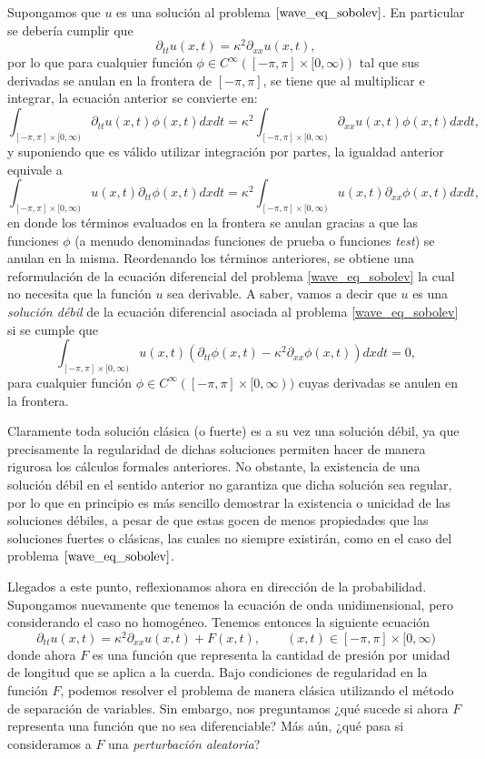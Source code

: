 \documentclass[letterpaper,twoside,12pt]{book}
\newcommand{\1}{\mathds{1}}
\theoremstyle{definition}
\theoremstyle{definition}
\theoremstyle{remark}
\theoremstyle{definition}
\theoremstyle{definition}
\theoremstyle{definition}
\theoremstyle{definition}
\theoremstyle{definition}
\begin{document}
Supongamos que $u$ es una solución al problema $\eqref{wave_eq_sobolev}$. En particular se debería cumplir que 
\[
\partial_{tt}u(x,t)=\kappa^2\partial_{xx}u(x,t),
\]
por lo que para cualquier función $\phi\in C^{\infty}\left([-\pi,\pi]\times [0,\infty)\right)$ tal que sus derivadas se anulan en la frontera de $[-\pi, \pi]$, se tiene que al multiplicar e integrar, la ecuación anterior se convierte en:
\[
    \int_{[-\pi,\pi]\times [0,\infty)}\partial_{tt}u(x,t)\phi(x,t)dx dt=\kappa^2\int_{[-\pi,\pi]\times [0,\infty)}\partial_{xx}u(x,t)\phi(x,t)dx dt,
\]
y suponiendo que es válido utilizar integración por partes, la igualdad anterior equivale a
\[
\int_{[-\pi,\pi]\times [0,\infty)}u(x,t)\partial_{tt}\phi(x,t)dx dt=\kappa^2\int_{[-\pi,\pi]\times [0,\infty)}u(x,t)\partial_{xx}\phi(x,t)dx dt,
\]
en donde los términos evaluados en la frontera se anulan gracias a que las funciones $\phi$ (a menudo denominadas funciones de prueba o funciones \textit{test}) se anulan en la misma. Reordenando los términos anteriores, se obtiene una reformulación de la ecuación diferencial del problema \eqref{wave_eq_sobolev} la cual no necesita que la función $u$ sea derivable. A saber, vamos a decir que $u$ es una \textit{solución débil} de la ecuación diferencial asociada al problema \eqref{wave_eq_sobolev} si se cumple que 
\[
\int_{[-\pi,\pi]\times [0,\infty)}u(x,t)(\partial_{tt}\phi(x,t)-\kappa^2\partial_{xx}\phi(x,t))dx dt=0,    
\]
para cualquier función $\phi\in C^{\infty}([-\pi,\pi]\times [0,\infty))$ cuyas derivadas se anulen en la frontera.

Claramente toda solución clásica (o fuerte) es a su vez una solución débil, ya que precisamente la regularidad de dichas soluciones permiten hacer de manera rigurosa los cálculos formales anteriores. No obstante, la existencia de una solución débil en el sentido anterior no garantiza que dicha solución sea regular, por lo que en principio es más sencillo demostrar la existencia o unicidad de las soluciones débiles, a pesar de que estas gocen de menos propiedades que las soluciones fuertes o clásicas, las cuales no siempre existirán, como en el caso del problema $\eqref{wave_eq_sobolev}$.

Llegados a este punto, reflexionamos ahora en dirección de la probabilidad. Supongamos nuevamente que tenemos la ecuación de onda unidimensional, pero considerando el caso no homogéneo. Tenemos entonces la siguiente ecuación
\begin{equation}\label{wave_spde}
\partial_{tt}u(x,t)=\kappa^2\partial_{xx}u(x,t)+F(x,t), \qquad (x,t)\in [-\pi,\pi]\times[0,\infty)
\end{equation}
donde ahora $F$ es una función que representa la cantidad de presión por unidad de longitud que se aplica a la cuerda. Bajo condiciones de regularidad en la función $F$, podemos resolver el problema de manera clásica utilizando el método de separación de variables. Sin embargo, nos preguntamos ¿qué sucede si ahora $F$ representa una función que no sea diferenciable? Más aún, ¿qué pasa si consideramos a $F$ una \textit{perturbación aleatoria}?
\end{document}
